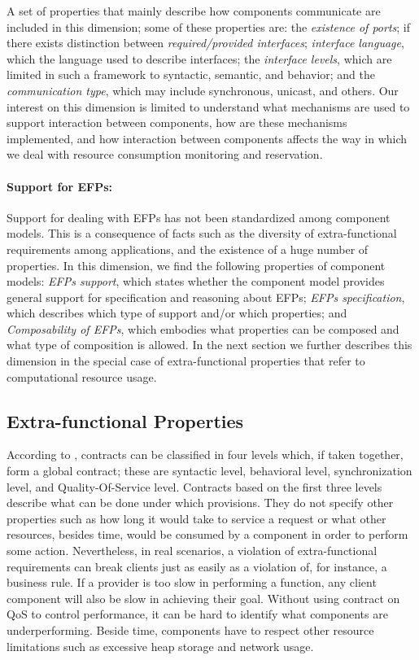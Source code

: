 A set of properties that mainly describe how components communicate are included in this dimension;
some of these properties are: the \textit{existence of ports}; if there exists distinction between \textit{required/provided interfaces}; \textit{interface language}, which the language used to describe interfaces; the \textit{interface levels}, which are limited in such a framework to syntactic, semantic, and behavior; and the \textit{communication type}, which may include synchronous, unicast, and others.
Our interest on this dimension is limited to understand what mechanisms are used to support interaction between components, how are these mechanisms implemented, and how interaction between components affects the way in which we deal with resource consumption monitoring and reservation. 

\paragraph{Support for EFPs:}

Support for dealing with EFPs has not been standardized among component models.
This is a consequence of facts such as the diversity of extra-functional requirements among applications, and the existence of a huge number of properties.
In this dimension, we find the following properties of component models: \textit{EFPs support}, which states whether the component model provides general support for specification and reasoning about EFPs; 
\textit{EFPs specification}, which describes which type of support and/or which properties;
and \textit{Composability of EFPs}, which embodies what properties can be composed and what type of composition is allowed.
In the next section we further describes this dimension in the special case of extra-functional properties that refer to computational resource usage.

\subsection{Extra-functional Properties} \label{sec:efp-resources}

According to \cite{Beugnard774917}, contracts can be classified in four levels which, if
taken together, form a global contract; these are syntactic level, behavioral level, synchronization level, and Quality-Of-Service level.
Contracts based on the first three levels describe what can be done under which provisions.
They do not specify other properties such as how long it would take to service a request or what other resources, besides time, would be consumed by a component in order to perform some action.
Nevertheless, in real scenarios, a violation of extra-functional
requirements can break clients just as easily as a violation of, for instance, a business rule. 
If a provider is too slow in performing a function, any client component will also be slow in achieving their goal.
Without using contract on QoS to control performance, it can be hard to identify what components are underperforming. 
Beside time, components have to respect other resource limitations such as excessive heap storage and network usage.

